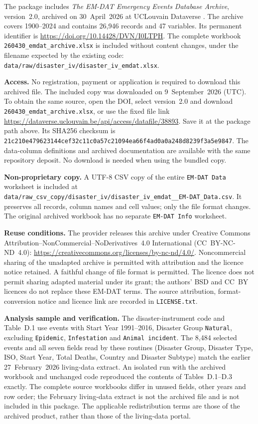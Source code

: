 \documentclass[11pt]{article}
\newcommand{\pkgfile}[1]{\nolinkurl{#1}}
\begin{document}
The package includes \emph{The EM-DAT Emergency Events Database Archive},
version~2.0, archived on 30~April~2026 at UCLouvain Dataverse
\citep{emdat}. The archive covers 1900--2024 and contains 26,946 records and
47 variables. Its permanent identifier is
\url{https://doi.org/10.14428/DVN/I0LTPH}. The complete workbook
\pkgfile{260430_emdat_archive.xlsx} is included without content changes,
under the filename expected by the existing code:
\pkgfile{data/raw/disaster_iv/disaster_iv_emdat.xlsx}.

\textbf{Access.} No registration, payment or application is required to
download this archived file. The included copy was downloaded on
9~September~2026 (UTC). To obtain the same source, open the DOI, select
version~2.0 and download \pkgfile{260430_emdat_archive.xlsx}, or use the
fixed file link \url{https://dataverse.uclouvain.be/api/access/datafile/38893}.
Save it at the package path above. Its SHA256 checksum is
\pkgfile{21c210e479623144cef32c11c0a57c21094ea66f4ad0a0a248d8239f3a5e9847}.
The data-column definitions and archived documentation are available with
the same repository deposit. No download is needed when using the bundled
copy.

\textbf{Non-proprietary copy.} A UTF-8 CSV copy of the entire
\texttt{EM-DAT Data} worksheet is included at
\pkgfile{data/raw_csv_copy/disaster_iv/disaster_iv_emdat__EM-DAT_Data.csv}.
It preserves all records, column names and cell values; only the file
format changes. The original archived workbook has no separate
\texttt{EM-DAT Info} worksheet.

\textbf{Reuse conditions.} The provider releases this archive under
Creative Commons Attribution--NonCommercial--NoDerivatives~4.0
International (CC~BY-NC-ND~4.0):
\url{https://creativecommons.org/licenses/by-nc-nd/4.0/}.
Noncommercial sharing of the unadapted archive is permitted with
attribution and the licence notice retained. A faithful change of file
format is permitted. The licence does not permit sharing adapted material
under its grant; the authors' BSD and CC~BY licences do not replace these
EM-DAT terms. The source attribution, format-conversion notice and licence
link are recorded in \pkgfile{LICENSE.txt}.

\textbf{Analysis sample and verification.} The disaster-instrument code
and Table~D.1 use events with Start Year 1991--2016, Disaster Group
\texttt{Natural}, excluding \texttt{Epidemic}, \texttt{Infestation} and
\texttt{Animal incident}. The 8,484 selected events and all seven fields
read by these routines (Disaster Group, Disaster Type, ISO, Start Year,
Total Deaths, Country and Disaster Subtype) match the earlier
27~February~2026 living-data extract. An isolated run with the archived
workbook and unchanged code reproduced the contents of Tables~D.1--D.3 exactly.
The complete source workbooks differ in unused fields, other years and
row order; the February living-data extract is not the archived file and
is not included in this package. The applicable redistribution terms are
those of the archived product, rather than those of the living-data portal.
\end{document}
